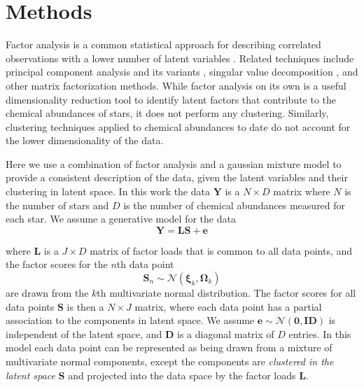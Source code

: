 \documentclass[twocolumn]{aastex61}
\newcommand{\vect}[1]{\boldsymbol{\mathbf{#1}}}
\renewcommand{\vec}[1]{\vect{#1}}
\newcommand{\data}{\textbf{Y}}
\newcommand{\vecdata}{\vec\data}
\newcommand{\eye}{\textbf{I}}
\newcommand{\factorloads}{\textbf{L}}
\newcommand{\factorscores}{\textbf{S}}
\newcommand{\specificvariance}{\vec{D}}
\newcommand{\NumData}{N}
\newcommand{\NumDimensions}{D}
\newcommand{\numdata}{n}
\newcommand{\NumLatentFactors}{J}
\newcommand{\numcomponents}{k}
\begin{document}
\section{Methods} \label{sec:methods}

Factor analysis is a common statistical approach for describing correlated 
observations with a lower number of latent variables \citep{factor-analysis}.
Related techniques include principal component analysis \citep{pca} and its
variants \citep{ppca}, singular value decomposition \citep{svd}, and other
matrix factorization methods. While factor analysis on its own is a useful
dimensionality reduction tool to identify latent factors that contribute to
the chemical abundances of stars, it does not perform any clustering.
Similarly, clustering techniques applied to chemical abundances to date 
\citep[e.g.,][]{Hogg:2016} do not account for the lower dimensionality of the
data. 


Here we use a combination of factor analysis and a gaussian mixture model to
provide a consistent description of the data, given the latent variables and 
their clustering in latent space. In this work the data $\vecdata$ is a 
$\NumData \times \NumDimensions$ matrix where $\NumData$ is the number of 
stars and $\NumDimensions$ is the number of chemical abundances measured 
for each star. We assume a generative model for the data 
\begin{equation}
	\vecdata = \factorloads\factorscores + \vec{e}
	\label{eq:generative-model}
\end{equation}

\noindent{}where $\factorloads$ is a $\NumLatentFactors \times \NumDimensions$ 
matrix of factor loads that is common to all data points, and the factor scores 
for the $\numdata$th data point
\begin{equation}
	\factorscores_\numdata \sim \mathcal{N}(\vec\xi_\numcomponents, \vec\Omega_\numcomponents)
\end{equation}
\noindent{}are drawn from the $\numcomponents$th multivariate normal distribution.
The factor scores for all data points $\factorscores$ is then a 
$\NumData \times \NumLatentFactors$ matrix, where each data point has a partial
association to the components in latent space. 
We assume $\vec{e} \sim \mathcal{N}\left(\vec{0}, \eye\specificvariance\right)$
is independent of the latent space, and $\specificvariance$ is a
diagonal matrix of $\NumDimensions$ entries. 
In this model each data point can be represented as being drawn
from a mixture of multivariate normal components, except the components
are \emph{clustered in the latent space} $\factorscores$ and projected
into the data space by the factor loads $\factorloads$. 
\end{document}
